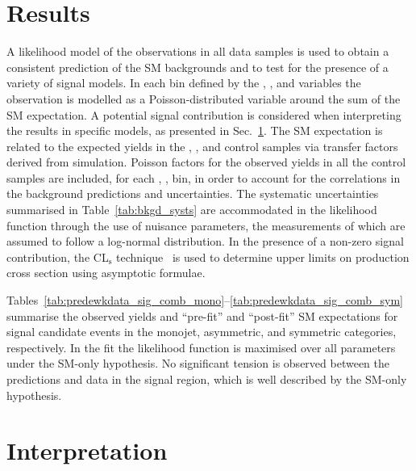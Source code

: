 \clearpage
\section{Results}
\label{sec:interpretation}

A likelihood model of the observations in all data samples is used to
obtain a consistent prediction of the SM backgrounds and to test for
the presence of a variety of signal models.  In each bin defined by the \njet, \nb, \scalht and \mht variables 
the observation is modelled as a Poisson-distributed variable around the sum of the SM
expectation. A potential signal contribution is considered when 
interpreting the results in specific models, as presented in Sec.~\ref{sec:interpretation}. 
The SM expectation is related to the expected yields in the \mj, \mmj, and \gj control samples via transfer
factors derived from simulation. Poisson factors for the 
observed yields in all the control samples  
are included, for each \njet, \nb, \scalht bin, in order to 
account for the correlations in the background predictions and uncertainties. 
The systematic uncertainties summarised in Table~\ref{tab:bkgd_systs} are
accommodated in the likelihood function through the use of nuisance parameters, the
measurements of which are assumed to follow a log-normal
distribution. In the presence of a non-zero signal contribution, the
CL$_{\mathrm{s}}$ technique~\cite{read, Cowan:2010js} is used to
determine upper limits on production cross section using asymptotic
formulae.

Tables~\ref{tab:predewkdata_sig_comb_mono}--\ref{tab:predewkdata_sig_comb_sym}
summarise the observed yields and ``pre-fit'' and ``post-fit'' SM
expectations for signal candidate events in the monojet, asymmetric,
and symmetric categories, respectively. 
In the fit the likelihood function is maximised over all parameters
under the SM-only hypothesis.
No significant tension is
observed between the predictions and data in the signal region, which
is well described by the SM-only hypothesis.


\clearpage

\clearpage

\clearpage

\section{Interpretation}

